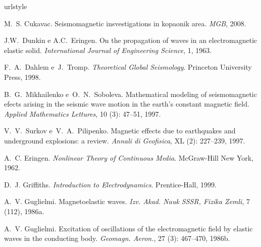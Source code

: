 \documentclass[12pt,a4paper,oneside]{abntex2}
\begin{document}
%
%
%



%


%

\begin{thebibliography}{25}
\providecommand{\natexlab}[1]{#1}
\providecommand{\url}[1]{\texttt{#1}}
\expandafter\ifx\csname urlstyle\endcsname\relax
  \providecommand{\doi}[1]{doi: #1}\else
  \providecommand{\doi}{doi: \begingroup \urlstyle{rm}\Url}\fi


M.~S. Cukavac.
\newblock Seismomagnetic insvestigations in kopaonik area.
\newblock \emph{MGB}, 2008.

J.W.~Dunkin e A.C.~Eringen.
\newblock On the propagation of waves in an electromagnetic elastic solid.
\newblock \emph{International Journal of Engineering Science}, 1, 1963.


F.~A.~Dahlem e~J.~Tromp.
\newblock \emph{Theoretical Global Seismology}.
\newblock Princeton University Press, 1998.

B.~G.~Mikhailenko e~O.~N.~Soboleva.
\newblock Mathematical modeling of seismomagnetic efects arising in the seismic
  wave motion in the earth's constant magnetic field.
\newblock \emph{Applied Mathematics Lettures}, 10 (3):
  47--51, 1997.

V.~V.~Surkov e~V.~A.~Pilipenko.
\newblock Magnetic effects due to earthquakes and underground explosions: a
  review.
\newblock \emph{Annali di Geofisica}, XL (2): 227--239, 1997.

A.~C. Eringen.
\newblock \emph{Nonlinear Theory of Continuous Media}.
\newblock McGraw-Hill New York, 1962.

D.~J. Griffiths.
\newblock \emph{Introduction to Electrodynamics}.
\newblock Prentice-Hall, 1999.

A.~V. Guglielmi.
\newblock Magnetoelastic waves.
\newblock \emph{Izv. Akad. Nauk SSSR, Fizika Zemli}, 7 (112), 1986a.

A.~V. Guglielmi.
\newblock Excitation of oscillations of the electromagnetic field by elastic
  waves in the conducting body.
\newblock \emph{Geomagn. Aeron.}, 27 (3): 467--470, 1986b.


\end{thebibliography}
\end{document}

